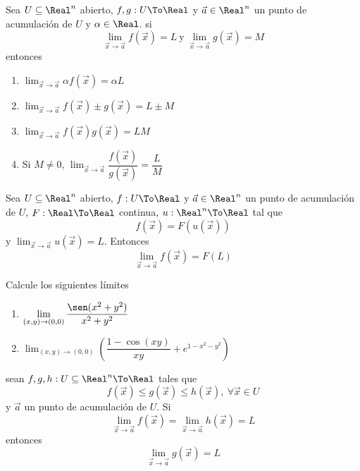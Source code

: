 \begin{frame}
  \begin{prop}
    Sea $U\subseteq\Real^n$ abierto, $f,g:U\To\Real$ y $\vec{a}\in\Real^n$ un punto de acumulación de $U$ y $\alpha\in\Real$. si
    $$\lim_{\vec{x}\to\vec{a}}f(\vec{x})=L\ \text{y}\ \lim_{\vec{x}\to\vec{a}}g(\vec{x})=M$$
    entonces
    \begin{enumerate}[<+->]
      \item $\displaystyle\lim_{\vec{x}\to\vec{a}}\alpha f(\vec{x})=\alpha L$
      \item $\displaystyle\lim_{\vec{x}\to\vec{a}}f(\vec{x})\pm g(\vec{x})=L\pm M$
      \item $\displaystyle\lim_{\vec{x}\to\vec{a}}f(\vec{x})g(\vec{x})=LM$
      \item Si $M\neq0$, $\displaystyle\lim_{\vec{x}\to\vec{a}}\dfrac{f(\vec{x})}{g(\vec{x})}=\dfrac{L}{M}$
    \end{enumerate}
  \end{prop}
\end{frame}

\begin{frame}
  \begin{thm}
    Sea $U\subseteq\Real^n$ abierto, $f:U\To\Real$ y $\vec{a}\in\Real^n$ un punto de acumulación de $U$, $F:\Real\To\Real$ continua, $u:\Real^n\To\Real$ tal que
    $$f(\vec{x})=F(u(\vec{x}))$$
    y $\lim_{\vec{x}\to\vec{a}}u(\vec{x})=L$. Entonces
    $$\lim_{\vec{x}\to\vec{a}}f(\vec{x})=F(L)$$
  \end{thm}
\end{frame}

\begin{frame}
  \begin{eg}
    Calcule los siguientes límites\\[0.25cm]
    \begin{enumerate}
      \item $\displaystyle\lim_{(x,y)\to(0,0)}\frac{\sen(x^2+y^2)}{x^2+y^2}$\\[0.5cm]
      \item $\displaystyle\lim_{(x,y)\to(0,0)}\left(\dfrac{1-\cos(xy)}{xy}+e^{1-x^2-y^2}\right)$
    \end{enumerate}
  \end{eg}
\end{frame}

\begin{frame}
  \begin{thm}
    sean $f,g,h:U\subseteq\Real^n\To\Real$ tales que
    $$f(\vec{x})\leq g(\vec{x})\leq h(\vec{x}),\ \forall\vec{x}\in U$$
    y $\vec{a}$ un punto de acumulación de $U$. Si
    $$\lim_{\vec{x}\to\vec{a}}f(\vec{x})=\lim_{\vec{x}\to\vec{a}}h(\vec{x})=L$$
    entonces
    $$\lim_{\vec{x}\to\vec{a}}g(\vec{x})=L$$
  \end{thm}
\end{frame}

